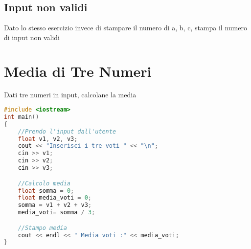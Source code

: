 \documentclass{article}
\begin{document}
\subsection{Input non validi} Dato lo stesso esercizio invece di stampare il numero di a, b, c, stampa il numero di input non validi
\pagebreak
\section{Media di Tre Numeri} Dati tre numeri in input, calcolane la media

\begin{lstlisting}[language=C++]
#include <iostream>
int main() 
{ 
    //Prendo l'input dall'utente
    float v1, v2, v3;
    cout << "Inserisci i tre voti " << "\n";
    cin >> v1;
    cin >> v2;
    cin >> v3;   

    //Calcolo media
    float somma = 0;
    float media_voti = 0;
    somma = v1 + v2 + v3;  
    media_voti= somma / 3;

    //Stampo media
    cout << endl << " Media voti :" << media_voti; 
}
\end{lstlisting}
\vspace*{\fill}
\clearpage
\end{document}
